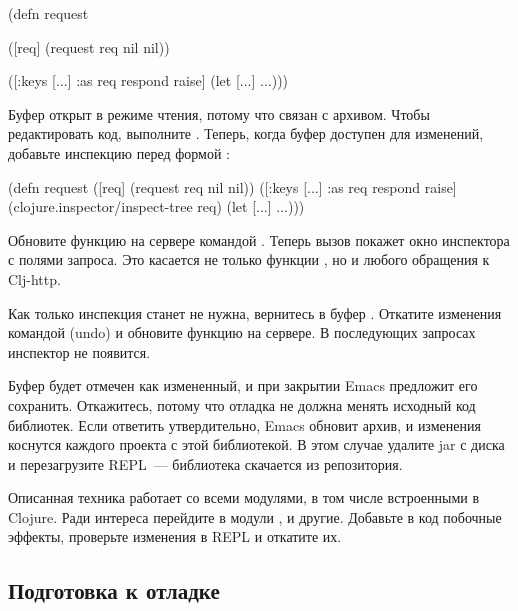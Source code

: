 \begin{english}
  \begin{clojure}
(defn request

  ([req]
   (request req nil nil))

  ([{:keys [...] :as req} respond raise]
   (let [...]
     ...)))
  \end{clojure}
\end{english}

Буфер  открыт в режиме чтения, потому что связан с архивом. Чтобы редактировать код, выполните . Теперь, когда буфер доступен для изменений, добавьте инспекцию перед формой  :

\pagebreaklarge

\begin{english}
  \begin{clojure/lines}
(defn request
  ([req] (request req nil nil))
  ([{:keys [...]
     :as req} respond raise]
   (clojure.inspector/inspect-tree req)
   (let [...]
     ...)))
  \end{clojure/lines}
\end{english}

Обновите функцию на сервере командой . Теперь вызов  покажет окно инспектора с полями запроса. Это касается не только функции , но и любого обращения к Clj-http.

Как только инспекция станет не нужна, вернитесь в буфер . Откатите изменения командой  (undo) и обновите функцию на сервере. В последующих запросах инспектор не появится.

Буфер  будет отмечен как измененный, и при закрытии Emacs предложит его сохранить. Откажитесь, потому что отладка не должна менять исходный код библиотек. Если ответить утвердительно, Emacs обновит архив, и изменения коснутся каждого проекта с этой библиотекой. В этом случае удалите jar с диска и перезагрузите REPL~--- библиотека скачается из репозитория.

Описанная техника работает со всеми модулями, в том числе встроенными в Clojure. Ради интереса перейдите в модули ,  и другие. Добавьте в код побочные эффекты, проверьте изменения в REPL и откатите их.

\subsection{Подготовка к отладке}


